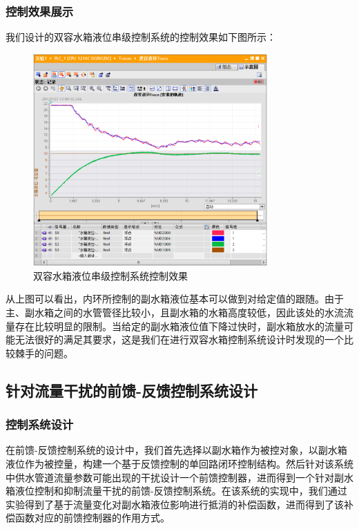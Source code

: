\documentclass[UTF8]{article}
\begin{document}
\subsubsection{控制效果展示}
我们设计的双容水箱液位串级控制系统的控制效果如下图所示：
\begin{figure}[H]
    \centering %
    \includegraphics[width=0.8\textwidth]{figure/双容水箱控制效果图.png} 
    \caption{双容水箱液位串级控制系统控制效果} %
\end{figure}
从上图可以看出，内环所控制的副水箱液位基本可以做到对给定值的跟随。由于主、副水箱之间的水管管径比较小，且副水箱的水箱高度较低，因此该处的水流流量存在比较明显的限制。当给定的副水箱液位值下降过快时，副水箱放水的流量可能无法很好的满足其要求，这是我们在进行双容水箱控制系统设计时发现的一个比较棘手的问题。

\subsection{针对流量干扰的前馈-反馈控制系统设计}
\subsubsection{控制系统设计}
在前馈-反馈控制系统的设计中，我们首先选择以副水箱作为被控对象，以副水箱液位作为被控量，构建一个基于反馈控制的单回路闭环控制结构。然后针对该系统中供水管道流量参数可能出现的干扰设计一个前馈控制器，进而得到一个针对副水箱液位控制和抑制流量干扰的前馈-反馈控制系统。在该系统的实现中，我们通过实验得到了基于流量变化对副水箱液位影响进行抵消的补偿函数，进而得到了该补偿函数对应的前馈控制器的作用方式。
\end{document}
